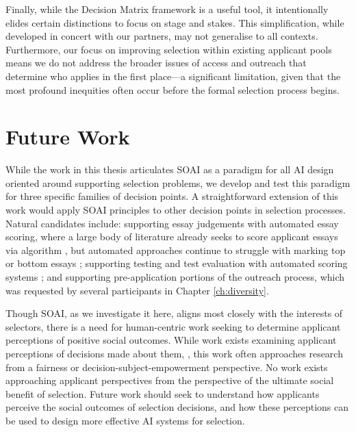Finally, while the Decision Matrix framework is a useful tool, it intentionally elides certain distinctions to focus on stage and stakes. This simplification, while developed in concert with our partners, may not generalise to all contexts. Furthermore, our focus on improving selection within existing applicant pools means we do not address the broader issues of access and outreach that determine who applies in the first place—a significant limitation, given that the most profound inequities often occur before the formal selection process begins.

\section{Future Work}
While the work in this thesis articulates SOAI as a paradigm for all AI design oriented around supporting selection problems, we develop and test this paradigm for three specific families of decision points. A straightforward extension of this work would apply SOAI principles to other decision points in selection processes. Natural candidates include: supporting essay judgements with automated essay scoring, where a large body of literature already seeks to score applicant essays via algorithm \cite{cozma_automated_2018,ramesh_automated_2022,wang_use_2022,elijahthesis}, but automated approaches continue to struggle with marking top or bottom essays \cite{elijahthesis}; supporting testing and test evaluation with automated scoring systems \cite{organisciak_beyond_2023,condon2014international}; and supporting pre-application portions of the outreach process, which was requested by several participants in Chapter \ref{ch:diversity}.

Though SOAI, as we investigate it here, aligns most closely with the interests of selectors, there is a need for human-centric work seeking to determine applicant perceptions of positive social outcomes. While work exists examining applicant perceptions of decisions made about them, \cite{pandey_applicants_2022,horodyski_applicants_2023}, this work often approaches research from a fairness or decision-subject-empowerment perspective. No work exists approaching applicant perspectives from the perspective of the ultimate social benefit of selection. Future work should seek to understand how applicants perceive the social outcomes of selection decisions, and how these perceptions can be used to design more effective AI systems for selection.

